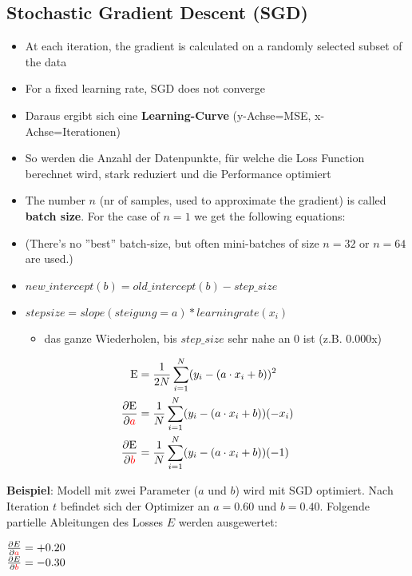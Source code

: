 \subsection{Stochastic Gradient Descent (SGD)}
\begin{itemize}
    \item At each iteration, the gradient is calculated on a randomly selected subset of the data
    \item For a fixed learning rate, SGD does not converge
    \item Daraus ergibt sich eine \textbf{Learning-Curve} (y-Achse=MSE, x-Achse=Iterationen)
    \item So werden die Anzahl der Datenpunkte, für welche die Loss Function berechnet wird, stark reduziert und die Performance optimiert
    \item The number $n$ (nr of samples, used to approximate the gradient) is called \textbf{batch size}. For the case of  $n=1$  we get the following equations:
    \item (There's no ''best'' batch-size, but often mini-batches of size $n=32$ or $n=64$ are used.)
    \item $new\_intercept (b) = old\_intercept (b) - step\_size$
    \item $step size = slope (steigung=a) * learning rate (x_i)$
    \begin{itemize}
        \item das ganze Wiederholen, bis $step\_size$ sehr nahe an 0 ist (z.B. 0.000x)
    \end{itemize}
\end{itemize}
\begin{align*}
\textrm{E} &= \frac{1}{2N} \sum_{i=1}^{N} (y_i - (a \cdot x_i + b))^2 \\
\frac{\partial \textrm{E}}{\partial \textcolor{red}{a}} &= \frac{1}{N} \sum_{i=1}^{N} (y_i - (a \cdot x_i + b)) (-x_i) \\
\frac{\partial \textrm{E}}{\partial \textcolor{red}{b}} &= \frac{1}{N} \sum_{i=1}^{N} (y_i - (a \cdot x_i + b)) (-1) \\ 
\end{align*}

\textbf{Beispiel}: Modell mit zwei Parameter ($a$ und $b$) wird mit SGD optimiert. Nach Iteration $t$ befindet sich der Optimizer an $a=0.60$ und $b=0.40$. Folgende partielle Ableitungen des Losses $E$ werden ausgewertet:

\begin{center}
    $\frac{\partial E}{\partial \textcolor{red}{a}} = +0.20$\\
    $\frac{\partial E}{\partial \textcolor{red}{b}} = -0.30$
\end{center}

